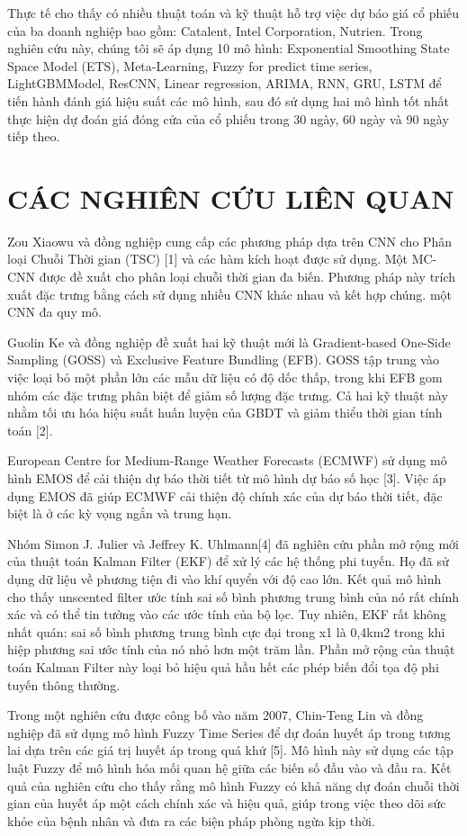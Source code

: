 \documentclass[conference]{IEEEtran}
\begin{document}
Thực tế cho thấy có nhiều thuật toán và kỹ thuật hỗ trợ việc dự báo giá cổ phiếu của ba doanh nghiệp bao gồm: Catalent, Intel Corporation, Nutrien. Trong nghiên cứu này, chúng tôi sẽ áp dụng 10 mô hình: Exponential Smoothing State Space Model (ETS), Meta-Learning, Fuzzy for predict time series, LightGBMModel, ResCNN, Linear regression, ARIMA, RNN, GRU, LSTM để tiến hành đánh giá hiệu suất các mô hình, sau đó sử dụng hai mô hình tốt nhất thực hiện dự đoán giá đóng cửa của cổ phiếu trong 30 ngày, 60 ngày và 90 ngày tiếp theo. 

\section{CÁC NGHIÊN CỨU LIÊN QUAN}
Zou Xiaowu và đồng nghiệp cung cấp các phương pháp dựa trên CNN cho Phân loại Chuỗi Thời gian (TSC) [1] và các hàm kích hoạt được sử dụng. Một MC-CNN được đề xuất cho phân loại chuỗi thời gian đa biến. Phương pháp này trích xuất đặc trưng bằng cách sử dụng nhiều CNN khác nhau và kết hợp chúng. một CNN đa quy mô.

Guolin Ke và đồng nghiệp đề xuất hai kỹ thuật mới là Gradient-based One-Side Sampling (GOSS) và Exclusive Feature Bundling (EFB). GOSS tập trung vào việc loại bỏ một phần lớn các mẫu dữ liệu có độ dốc thấp, trong khi EFB gom nhóm các đặc trưng phân biệt để giảm số lượng đặc trưng. Cả hai kỹ thuật này nhằm tối ưu hóa hiệu suất huấn luyện của GBDT và giảm thiểu thời gian tính toán [2].

European Centre for Medium-Range Weather Forecasts (ECMWF) sử dụng mô hình EMOS để cải thiện dự báo thời tiết từ mô hình dự báo số học [3]. Việc áp dụng EMOS đã giúp ECMWF cải thiện độ chính xác của dự báo thời tiết, đặc biệt là ở các kỳ vọng ngắn và trung hạn.

Nhóm Simon J. Julier và Jeffrey K. Uhlmann[4] đã nghiên cứu phần mở rộng mới của thuật toán Kalman Filter (EKF) để xử lý các hệ thống phi tuyến. Họ đã sử dụng dữ liệu về phương tiện đi vào khí quyển với độ cao lớn. Kết quả mô hình cho thấy unscented filter ước tính sai số bình phương trung bình của nó rất chính xác và có thể tin tưởng vào các ước tính của bộ lọc. Tuy nhiên, EKF rất không nhất quán: sai số bình phương trung bình cực đại trong x1 là 0,4km2 trong khi hiệp phương sai ước tính của nó nhỏ hơn một trăm lần. Phần mở rộng của thuật toán Kalman Filter này loại bỏ hiệu quả hầu hết các phép biến đổi tọa độ phi tuyến thông thường.

Trong một nghiên cứu được công bố vào năm 2007, Chin-Teng Lin và đồng nghiệp đã sử dụng mô hình Fuzzy Time Series để dự đoán huyết áp trong tương lai dựa trên các giá trị huyết áp trong quá khứ [5]. Mô hình này sử dụng các tập luật Fuzzy để mô hình hóa mối quan hệ giữa các biến số đầu vào và đầu ra. Kết quả của nghiên cứu cho thấy rằng mô hình Fuzzy có khả năng dự đoán chuỗi thời gian của huyết áp một cách chính xác và hiệu quả, giúp trong việc theo dõi sức khỏe của bệnh nhân và đưa ra các biện pháp phòng ngừa kịp thời.
\end{document}
